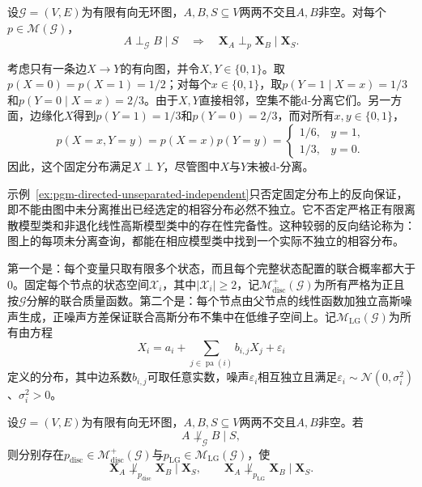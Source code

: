 \begin{theorem}[d-分离的可靠性]
  \label{thm:pgm-directed-soundness}
  设$\mathcal{G}=(V,E)$为有限有向无环图，$A,B,S\subseteq V$两两不交且$A,B$非空。对每个$p\in\mathcal{M}(\mathcal{G})$，
  \begin{equation}
    A\perp_{\mathcal{G}}B\mid S
    \quad\Longrightarrow\quad
    \bm{X}_A\perp_p\bm{X}_B\mid\bm{X}_S.
    \label{eq:pgm-directed-soundness}
  \end{equation}
\end{theorem}

\begin{example}[未分离但独立的固定分布]
  \label{ex:pgm-directed-unseparated-independent}
  考虑只有一条边$X\to Y$的有向图，并令$X,Y\in\{0,1\}$。取$p(X=0)=p(X=1)=1/2$；对每个$x\in\{0,1\}$，取$p(Y=1\mid X=x)=1/3$和$p(Y=0\mid X=x)=2/3$。由于$X,Y$直接相邻，空集不能d-分离它们。另一方面，边缘化$X$得到$p(Y=1)=1/3$和$p(Y=0)=2/3$，而对所有$x,y\in\{0,1\}$，
  \[
    p(X=x,Y=y)
    =
    p(X=x)p(Y=y)
    =
    \begin{cases}
      1/6,&y=1,\\
      1/3,&y=0.
    \end{cases}
  \]
  因此，这个固定分布满足$X\perp Y$，尽管图中$X$与$Y$未被d-分离。
\end{example}

示例~\ref{ex:pgm-directed-unseparated-independent}只否定固定分布上的反向保证，即不能由图中未分离推出已经选定的相容分布必然不独立。它不否定严格正有限离散模型类和非退化线性高斯模型类中的存在性完备性。这种较弱的反向结论称为：图上的每项未分离查询，都能在相应模型类中找到一个实际不独立的相容分布。

第一个是：每个变量只取有限多个状态，而且每个完整状态配置的联合概率都大于$0$。固定每个节点的状态空间$\mathcal{X}_i$，其中$|\mathcal{X}_i|\geq2$，记$\mathcal{M}_{\mathrm{disc}}^{+}(\mathcal{G})$为所有严格为正且按$\mathcal{G}$分解的联合质量函数。第二个是：每个节点由父节点的线性函数加独立高斯噪声生成，正噪声方差保证联合高斯分布不集中在低维子空间上。记$\mathcal{M}_{\mathrm{LG}}(\mathcal{G})$为所有由方程
\[
  X_i=a_i+\sum_{j\in\operatorname{pa}(i)}b_{i,j}X_j+\varepsilon_i
\]
定义的分布，其中边系数$b_{i,j}$可取任意实数，噪声$\varepsilon_i$相互独立且满足$\varepsilon_i\sim\mathcal{N}(0,\sigma_i^2)$、$\sigma_i^2>0$。

\begin{theorem}[d-分离在特定模型类中的完备性]
  \label{thm:pgm-directed-completeness}
  设$\mathcal{G}=(V,E)$为有限有向无环图，$A,B,S\subseteq V$两两不交且$A,B$非空。若
  \[
    A\not\perp_{\mathcal{G}}B\mid S,
  \]
  则分别存在$p_{\mathrm{disc}}\in\mathcal{M}_{\mathrm{disc}}^{+}(\mathcal{G})$与$p_{\mathrm{LG}}\in\mathcal{M}_{\mathrm{LG}}(\mathcal{G})$，使
  \begin{equation}
    \bm{X}_A\not\perp_{p_{\mathrm{disc}}}\bm{X}_B\mid\bm{X}_S,
    \qquad
    \bm{X}_A\not\perp_{p_{\mathrm{LG}}}\bm{X}_B\mid\bm{X}_S.
    \label{eq:pgm-directed-completeness}
  \end{equation}
\end{theorem}

